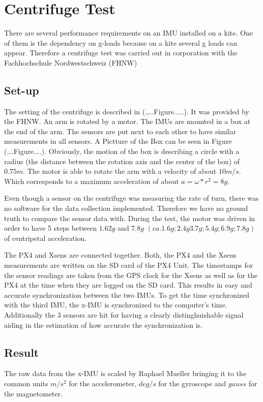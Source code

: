 \section{Centrifuge Test}
There are several performance requirements on an IMU installed on a kite. One of them is the dependency on g-loads because on a kite several g loads can appear. Therefore a centrifuge test was carried out in corporation with the Fachhochschule Nordwestschweiz (FHNW)
\subsection{Set-up}
The setting of the centrifuge is described in (…..Figure.....). It was provided by the FHNW. An arm is rotated by a motor. The IMUs are mounted in a box at the end of the arm. The sensors are put next to each other to have similar measurements in all sensors. A Pictture of the Box can be seen in Figure (….Figure....). Obviously, the motion of the box is describing a circle with a radius (the distance between the rotation axis and the  center of the box) of $0.75 m$. The motor is able to rotate the arm with a velocity of about $10 m/s$. Which corresponds to a maximum acceleration of about $ a=\omega*r^2=8 g$. 

Even though a sensor on the centrifuge was measuring the rate of turn, there was no software for the data collection implemented. Therefore we have no ground truth to compare the sensor data with. 
During the test, the motor was driven in order to have 5 steps between $1.62 g$ and $7.8 g$ $(ca. 1.6 g; 2.4 g 3.7 g; 5.4 g; 6.9 g; 7.8 g)$ of centripetal acceleration.

The PX4 and Xsens are connected together. Both, the PX4 and the Xsens measurements are written on the SD card of the PX4 Unit. The timestamps for the sensor readings are taken from the GPS clock for the Xsens as well as for the PX4 at the time when they are logged on the SD card. This results in easy and accurate synchronization between the two IMUs. To get the time synchronized with the third IMU, the x-IMU is synchronized to the computer's time. Additionally the 3 sensors are hit for having a clearly distinghuishable signal aiding in the estimation of how accurate the synchronization is.
\subsection{Result}
The raw data from the x-IMU is scaled by Raphael Mueller bringing it to the common units $m/s^2$ for the accelerometer, $deg/s$ for the gyroscope and $gauss$ for the magnetometer.

